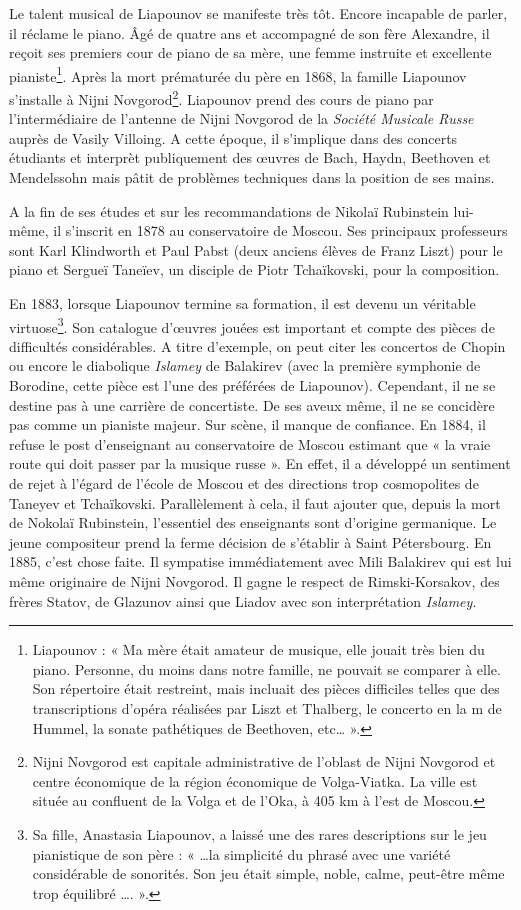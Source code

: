 Le talent musical de Liapounov se manifeste très tôt. Encore incapable de parler, il réclame le piano. Âgé de quatre ans et accompagné de son fère Alexandre, il reçoit ses premiers cour de piano de sa mère, une femme instruite et excellente pianiste\footnote{Liapounov : « Ma mère était amateur de musique, elle jouait très bien du piano. Personne, du moins dans notre famille, ne pouvait se comparer à elle. Son répertoire était restreint, mais incluait des pièces difficiles telles que des transcriptions d'opéra réalisées par Liszt et Thalberg, le concerto en la m de Hummel, la sonate pathétiques de Beethoven, etc\dots{} ».}. Après la mort prématurée du père en 1868, la famille Liapounov s'installe à Nijni Novgorod\footnote{Nijni Novgorod est capitale administrative de l'oblast de Nijni Novgorod et centre économique de la région économique de Volga-Viatka. La ville est située au confluent de la Volga et de l'Oka, à 405 km à l'est de Moscou.}. Liapounov prend des cours de piano par l'intermédiaire de l'antenne de Nijni Novgorod de la \emph{Société Musicale Russe} auprès de Vasily Villoing. A cette époque, il s'implique dans des concerts étudiants et interprèt publiquement des œuvres de Bach, Haydn, Beethoven et Mendelssohn mais pâtit de problèmes techniques dans la position de ses mains. 

A la fin de ses études et sur les recommandations de Nikolaï Rubinstein lui-même, il s'inscrit en 1878 au conservatoire de Moscou. Ses principaux professeurs sont Karl Klindworth et Paul Pabst (deux anciens élèves de Franz Liszt) pour le piano et Sergueï Taneïev, un disciple de Piotr Tchaïkovski, pour la composition.

En 1883, lorsque Liapounov termine sa formation, il est devenu un véritable virtuose\footnote{Sa fille, Anastasia Liapounov, a laissé une des rares descriptions sur le jeu pianistique de son père : « \ldots la simplicité du phrasé avec une variété considérable de sonorités. Son jeu était simple, noble, calme, peut-être même trop équilibré \ldots. ».}. Son catalogue d'œuvres jouées est important et compte des pièces de difficultés considérables. A titre d'exemple, on peut citer les concertos de Chopin ou encore le diabolique \emph{Islamey} de Balakirev (avec la première symphonie de Borodine, cette pièce est l'une des préférées de Liapounov). Cependant, il ne se destine pas à une carrière de concertiste. De ses aveux même, il ne se concidère pas comme un pianiste majeur. Sur scène, il manque de confiance. En 1884, il refuse le post d'enseignant au conservatoire de Moscou estimant que « la vraie route qui doit passer par la musique russe ». En effet, il a développé un sentiment de rejet à l'égard de l'école de Moscou et des directions trop cosmopolites de Taneyev et Tchaïkovski. Parallèlement à cela, il faut ajouter que, depuis la mort de Nokolaï Rubinstein, l'essentiel des enseignants sont d'origine germanique. Le jeune compositeur prend la ferme décision de s'établir à Saint Pétersbourg. En 1885, c'est chose faite. Il sympatise immédiatement avec Mili Balakirev qui est lui même originaire de Nijni Novgorod. Il gagne le respect de Rimski-Korsakov, des frères Statov, de Glazunov ainsi que Liadov avec son interprétation \emph{Islamey}.

